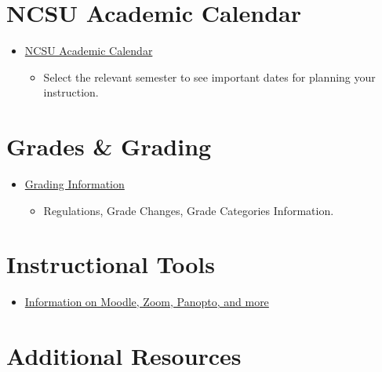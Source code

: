\documentclass[
]{book}
\providecommand{\tightlist}{%
  \setlength{\itemsep}{0pt}\setlength{\parskip}{0pt}}
\begin{document}
\hypertarget{ncsu-academic-calendar}{%
\section{NCSU Academic Calendar}\label{ncsu-academic-calendar}}

\begin{itemize}
\tightlist
\item
  \href{https://studentservices.ncsu.edu/calendars/academic/}{NCSU Academic Calendar}

  \begin{itemize}
  \tightlist
  \item
    Select the relevant semester to see important dates for planning your instruction.
  \end{itemize}
\end{itemize}

\hypertarget{grades-grading}{%
\section{Grades \& Grading}\label{grades-grading}}

\begin{itemize}
\tightlist
\item
  \href{https://registrar.ncsu.edu/facultygradinginfo/}{Grading Information}

  \begin{itemize}
  \tightlist
  \item
    Regulations, Grade Changes, Grade Categories Information.
  \end{itemize}
\end{itemize}

\hypertarget{instructional-tools}{%
\section{Instructional Tools}\label{instructional-tools}}

\begin{itemize}
\tightlist
\item
  \href{https://delta.ncsu.edu/learning-technology/instructional-tools/}{Information on Moodle, Zoom, Panopto, and more}
\end{itemize}

\hypertarget{additional-resources}{%
\section{Additional Resources}\label{additional-resources}}
\end{document}
